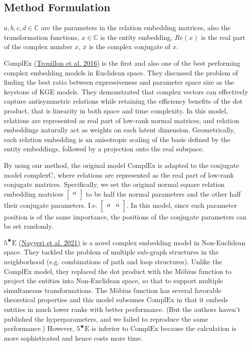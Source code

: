 \documentclass[11pt]{article}
\begin{document}
\subsection{Method Formulation}
$a,b,c,d \in \mathbb{C}$ are the parameters in the relation embedding matrices, also the transformation functions, 
$x \in \mathbb{C}$ is the entity embedding,
$Re(x)$ is the real part of the complex number $x$,
$\overline{x}$ is the complex conjugate of $x$.

$\mathrm{ComplEx}$
\hyperlink{Tro16}{(Trouillon et al. 2016)} is the first and also one of the best performing complex embedding models in Euclidean space.
They discussed the problem of finding the best ratio between expressiveness and parameter space size as the keystone of KGE models.
They demonstrated that complex vectors can effectively capture antisymmetric relations while retaining the efficiency benefits of the dot product, that is linearity in both space and time complexity.
In this model, relations are represented as real part of low-rank normal matrices, and relation embeddings naturally act as weights on each latent dimension.
Geometrically, each relation embedding is an anisotropic scaling of the basis defined by the entity embeddings, followed by a projection onto the real subspace.

By using our method, the original model $\mathrm{ComplEx}$ is adapted to the conjugate model $\mathrm{complexC}$, where relations are represented as the real part of low-rank conjugate matrices.
Specifically, we set the original normal square relation embedding matrices 
$\begin{bmatrix}
    a\\
\end{bmatrix}$
to be half the normal parameters and the other half their conjugate parameters. I.e.
$\begin{bmatrix}
    a & \overline{a}\\
\end{bmatrix}$.
In this model, since each parameter position is of the same importance, the positions of the conjugate parameters can be set randomly.

$5^{\bigstar}\mathrm{E}$
\hyperlink{Nay21}{(Nayyeri et al. 2021)} is a novel complex embedding model in Non-Euclidean space.
They tackled the problem of multiple sub-graph structures in the neighborhood (e.g. combinations of path and loop structures).
Unlike the $\mathrm{ComplEx}$ model, they replaced the dot product with the Möbius function to project the entities into Non-Euclidean space, so that to support multiple simultaneous transformations. 
The Möbius function has several favorable theoretical properties and this model subsumes $\mathrm{ComplEx}$ in that it embeds entities in much lower ranks with better performance.
(But the authors haven't published the hyperparameters, and we failed to reproduce the same performance.)
However, $5^{\bigstar}\mathrm{E}$ is inferior to $\mathrm{ComplEx}$ because the calculation is more sophisticated and hence costs more time.
\end{document}
